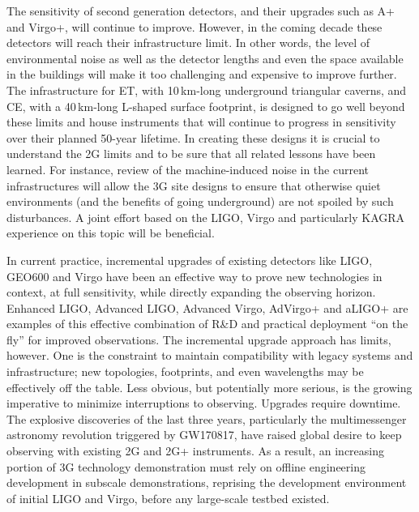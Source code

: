 The sensitivity of second generation detectors, and their upgrades such as A+ and Virgo+, will continue to improve. 
However, in the coming decade these detectors will reach their infrastructure limit. In other words, the level of environmental noise as well as the detector lengths and even the space available in the buildings will make it too challenging and expensive to improve further. The infrastructure for ET, with 10\,km-long underground triangular caverns, and CE, with a 40\,km-long L-shaped surface footprint, is designed to go well beyond these limits and house instruments that will continue to progress in sensitivity over their planned 50-year lifetime.   
In creating these designs it is crucial to understand the 2G limits and to be sure that all related lessons have been learned. For instance, review of the machine-induced noise in the current infrastructures will allow the 3G site designs to ensure that otherwise quiet environments (and the benefits of going underground) are not spoiled by such disturbances. A joint effort based on the LIGO, Virgo and particularly KAGRA experience on this topic will be beneficial. 

In current practice, incremental upgrades of existing detectors like LIGO, GEO600  and Virgo have been an effective way to prove new technologies in context, at full sensitivity, while directly expanding the observing horizon. Enhanced LIGO, Advanced LIGO, Advanced Virgo, AdVirgo+ and aLIGO+ are examples of this effective combination of R\&D and practical deployment ``on the fly''  for improved observations.  
The incremental upgrade approach has limits, however.  One is the constraint to maintain compatibility with legacy systems and infrastructure; new topologies, footprints, and even wavelengths may be effectively off the table. Less obvious, but potentially more serious, is the growing imperative to minimize interruptions to observing. Upgrades require downtime.  The explosive discoveries of the last three years, particularly the multimessenger astronomy revolution triggered by GW170817,  have raised global desire to keep observing with existing 2G and 2G+ instruments. 
As a result, an increasing portion of 3G technology demonstration must rely on offline engineering development in subscale demonstrations, reprising the development environment of initial LIGO and Virgo, before any large-scale testbed existed. 

